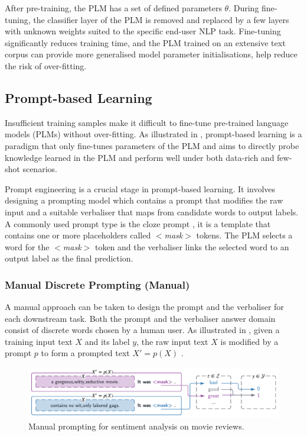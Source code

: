 After pre-training, the PLM has a set of defined parameters $\theta$. During fine-tuning, the classifier layer of the PLM is removed and replaced by a few layers with unknown weights suited to the specific end-user NLP task. Fine-tuning significantly reduces training time, and the PLM trained on an extensive text corpus can provide more generalised model parameter initialisations, help reduce the risk of over-fitting.

\subsection{Prompt-based Learning}
Insufficient training samples make it difficult to fine-tune pre-trained language models (PLMs) without over-fitting. As illustrated in , prompt-based learning is a paradigm that only fine-tunes parameters of the PLM and aims to directly probe knowledge learned in the PLM and perform well under both data-rich and few-shot scenarios.

Prompt engineering is a crucial stage in prompt-based learning. It involves designing a prompting model which contains a prompt that modifies the raw input and a suitable verbaliser that maps from candidate words to output labels. A commonly used prompt type is the cloze prompt \cite{Petroni19Cloze, Cui21Cloze}, it is a template that contains one or more placeholders called $<$\textit{mask}$>$ tokens. The PLM selects a word for the $<$\textit{mask}$>$ token and the verbaliser links the selected word to an output label as the final prediction.

\subsubsection{Manual Discrete Prompting (Manual)}
A manual approach can be taken to design the prompt and the verbaliser for each downstream task. Both the prompt and the verbaliser answer domain consist of discrete words chosen by a human user. As illustrated in , given a training input text $X$ and its label $y$, the raw input text $X$ is modified by a prompt $p$ to form a prompted text $X' = p(X)$ \cite{Liu21}. 

\vspace{-0.5em}
\begin{figure}[!ht]
    \centering
    \includegraphics[width=\hsize]{figures/preparation_media/prepare-manual.pdf}
    \caption{Manual prompting for sentiment analysis on movie reviews.}
    \label{fig:prepare-manual}
\end{figure}


